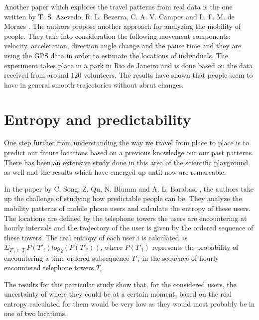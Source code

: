 Another paper which explores the travel patterns from real data is the one
written by T. S. Azevedo, R. L. Bezerra, C. A. V. Campos and L. F. M. de Moraes
\cite{Azevedo09}. The authors propose another approach for analyzing the mobility
of people. They take into consideration the following movement components:
velocity, acceleration, direction angle change and the pause time and they are
using the GPS data in order to estimate the locations of individuals. The
experiment takes place in a park in Rio de Janeiro and is done based on the data
received from around $120$ volunteers. The results have shown that people seem
to have in general smooth trajectories without abrut changes.

\section{Entropy and predictability}
One step further from understanding the way we travel from place to place is to
predict our future locations based on a previous knowledge our our past
patterns. There has been an extensive study done in this area of the scientific
playground as well and the results which have emerged up until now are
remarcable.

In the paper by C. Song, Z. Qu, N. Blumm and A. L. Barabasi \cite{Barabasi10},
the authors take up the challenge of studying how predictable people can be.
They analyze the mobility patterns of mobile phone users and calculate the
entropy of these users. The locations are defined by the telephone towers the
users are encountering at hourly intervals and the trajectory of the user is
given by the ordered sequence of these towers. The real entropy of each user i
is calculated as $\Sigma _{T'_{i}\subset T_{i}} P(T'_{i})log_{2}(P(T'_{i}))$,
where $P(T'_{i})$ represents the probability of encountering a time-ordered
subsequence $T'_{i}$ in the sequence of hourly encountered telephone towers
$T_{i}$.

The results for this particular study show that, for the considered users, the
uncertainty of where they could be at a certain moment, based on the real
entropy calculated for them would be very low as they would most probably be in
one of two locations.

